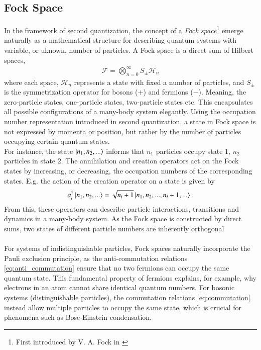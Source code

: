 \documentclass{subfiles}
\begin{document}
\subsection*{Fock Space}
In the framework of second quantization, the concept of a \emph{Fock space}\footnote{First introduced by V. A. Fock in \cite{fock1932konfigurationsraum}} emerge naturally as a mathematical structure for describing quantum systems with variable, or uknown, number of particles. A Fock space is a direct sum of Hilbert spaces, 
\begin{align*}
    \mathcal{F} = \bigotimes_{n=0}^\infty S_{\pm} \mathcal{H}_n
\end{align*}
where each space, $\mathcal{H}_n$ represents a state with fixed a number of particles, and $S_{\pm}$ is the symmetrization operator for bosons ($+$) and fermions ($-$). Meaning, the zero-particle states, one-particle states, two-particle states etc. This encapsulates all possible configurations of a many-body system elegantly. Using the occupation number representation introduced in second quantization, a state in Fock space is not expressed by momenta or position, but rather by the number of particles occupying certain quantum states. \\
For instance, the state $\ket{n_1, n_2, ...}$ informs that $n_1$ particles occupy state $1$, $n_2$ particles  in state $2$. The annihilation and creation operators act on the Fock states by increasing, or decreasing, the occupation numbers of the corresponding states. E.g. the action of the creation operator on a state is given by
\begin{align*}
    a^\dagger_i\ket{n_1, n_2, ...} = \sqrt{n_i + 1}\ket{n_1, n_2, ..., n_i + 1, ...}.
\end{align*}
From this, these operators can describe particle interactions, transitions and dynamics in a many-body system. As the Fock space is constructed by direct sums, two states of different particle numbers are inherently orthogonal 
\\\\ 
For systems of indistinguishable particles, Fock spaces naturally incorporate the Pauli exclusion principle, as the anti-commutation relations \ref{eq:anti_commutation} ensure that no two fermions can occupy the same quantum state. This fundamental property of fermions explains, for example, why electrons in an atom cannot share identical quantum numbers. For bosonic systems (distinguishable particles), the commutation relations \ref{eq:commutation} instead allow multiple particles to occupy the same state, which is crucial for phenomena such as Bose-Einstein condensation.
\end{document}
